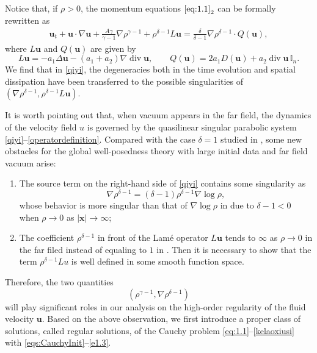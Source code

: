\documentclass[11pt,reqno]{amsart}
\DeclareMathOperator{\diver}{\mathrm{div}}
\numberwithin{rk}{section}
\numberwithin{prop}{section}
\numberwithin{mydef}{section}
\numberwithin{lem}{section}
\numberwithin{equation}{section}
\numberwithin{thm}{section}
\begin{document}
Notice that,  if  $\rho>0$, the momentum equations $\eqref{eq:1.1}_2$ can be formally rewritten as
\begin{equation}\label{qiyi}
\begin{aligned}
\boldsymbol{u}_t+\boldsymbol{u}\cdot\nabla \boldsymbol{u} +\frac{A\gamma}{\gamma-1}\nabla\rho^{\gamma-1}+ \rho^{\delta-1} L\boldsymbol{u}=\frac{\delta}{\delta-1}\nabla \rho^{\delta-1} \cdot  Q(\boldsymbol{u}),
\end{aligned}
\end{equation}
where $L \boldsymbol{u}$ and $Q(\boldsymbol{u})$ are  given by
\begin{equation}\label{operatordefinition}
L\boldsymbol{u}=-a_1\Delta \boldsymbol{u}-(a_1+a_2)\nabla \diver\boldsymbol{u},\qquad Q(\boldsymbol{u})=2a_1 D(\boldsymbol{u})+a_2\diver\boldsymbol{u}\,\mathbb{I}_n.
\end{equation}
We find that in  \eqref{qiyi}, the degeneracies both in the time evolution and spatial dissipation have been transferred to the possible singularities of $(\nabla  \rho^{\delta-1},\rho^{\delta-1}L\boldsymbol{u})$.


It is worth pointing out that, when vacuum appears in the far field,   the dynamics of the velocity field $u$ is governed by the quasilinear singular parabolic system \eqref{qiyi}--\eqref{operatordefinition}.  Compared with  the case  $\delta= 1$ studied in \cite{clz1,CZZ1,sz3},
some new obstacles for the global well-posedness theory with large initial data and far field vacuum arise:
\begin{enumerate}
\item[(i)]
The source term on the right-hand side of \eqref{qiyi} contains some singularity as
\begin{equation*}
\nabla \rho^{\delta-1}=(\delta-1)\rho^{\delta-1}\nabla \log \rho,
\end{equation*}
whose behavior is more singular than that of $\nabla \log \rho $ in \cite{clz1,CZZ1,sz3} due to $\delta-1<0$ when $\rho \to 0$ as $|\boldsymbol{x}|\to \infty$;
\smallskip
\item[(ii)]
The coefficient $\rho^{\delta-1}$ in front of the Lam\'e operator $ L\boldsymbol{u}$  tends to $\infty$ as $\rho\to 0$ in the far filed instead of equaling to $1$  in \cite{clz1,CZZ1,sz3}. Then it is necessary to show that the term $\rho^{\delta-1} Lu$ is well defined in some smooth function space.
\end{enumerate}


Therefore, the two quantities
\begin{equation*}
(\rho^{\gamma-1}, \nabla \rho^{\delta-1})
\end{equation*}
will play significant roles in our analysis on the high-order regularity of the fluid velocity 
$\boldsymbol{u}$. 
Based on the above observation, we first introduce a proper class of solutions, called regular solutions, of the Cauchy problem \eqref{eq:1.1}--\eqref{kelaoxiusi} with \eqref{eqs:CauchyInit}--\eqref{e1.3}.
\end{document}
